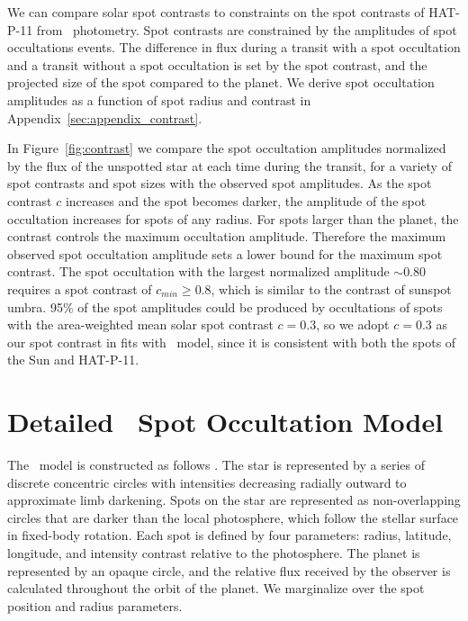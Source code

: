 We can compare solar spot contrasts to constraints on the spot contrasts of HAT-P-11 from \kepler\ photometry. Spot contrasts are constrained by the amplitudes of spot occultations events. The difference in flux during a transit with a spot occultation and a transit without a spot occultation is set by the spot contrast, and the projected size of the spot compared to the planet. We derive spot occultation amplitudes as a function of spot radius and contrast in Appendix~\ref{sec:appendix_contrast}.

In Figure~\ref{fig:contrast} we compare the spot occultation amplitudes normalized by the flux of the unspotted star at each time during the transit, for a variety of spot contrasts and spot sizes with the observed spot amplitudes. As the spot contrast $c$ increases and the spot becomes darker, the amplitude of the spot occultation increases for spots of any radius. For spots larger than the planet, the contrast controls the maximum occultation amplitude. Therefore the maximum observed spot occultation amplitude sets a lower bound for the maximum spot contrast. The spot occultation with the largest normalized amplitude $\sim 0.80$ requires a spot contrast of $c_{min} \ge 0.8$, which is similar to the contrast of sunspot umbra. 95\% of the spot amplitudes could be produced by occultations of spots with the area-weighted mean solar spot contrast $c = 0.3$, so we adopt $c = 0.3$ as our spot contrast in fits with \stsp\ model, since it is consistent with both the spots of the Sun and HAT-P-11.

\section{Detailed \stsp\ Spot Occultation Model} \label{sec:stsp}

The \stsp\ model is constructed as follows \citep[see][for more details]{Hebb2017}. The star is represented by a series of discrete concentric circles with intensities decreasing radially outward to approximate limb darkening. Spots on the star are represented as non-overlapping circles that are darker than the local photosphere, which follow the stellar surface in fixed-body rotation. Each spot is defined by four parameters: radius, latitude, longitude, and intensity contrast relative to the photosphere. The planet is represented by an opaque circle, and the relative flux received by the observer is calculated throughout the orbit of the planet. We marginalize over the spot position and radius parameters.

